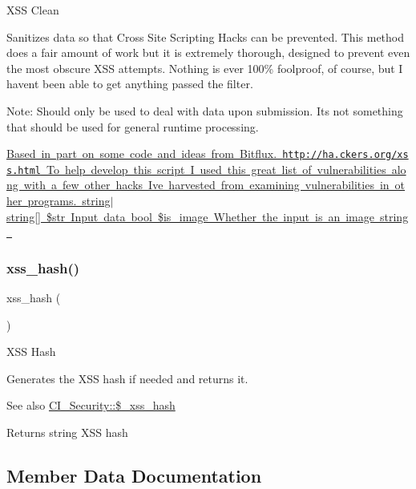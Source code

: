 X\+SS Clean

Sanitizes data so that Cross Site Scripting Hacks can be prevented. This method does a fair amount of work but it is extremely thorough, designed to prevent even the most obscure X\+SS attempts. Nothing is ever 100\% foolproof, of course, but I haven\textquotesingle{}t been able to get anything passed the filter.

Note\+: Should only be used to deal with data upon submission. It\textquotesingle{}s not something that should be used for general runtime processing.

\mbox{\hyperlink{}{Based in part on some code and ideas from Bitflux.  \href{http://ha.ckers.org/xss.html}{\tt http\+://ha.\+ckers.\+org/xss.\+html} To help develop this script I used this great list of vulnerabilities along with a few other hacks I\textquotesingle{}ve harvested from examining vulnerabilities in other programs.  string$\vert$string\mbox{[}\mbox{]} \$str Input data  bool \$is\+\_\+image Whether the input is an image  string }}\mbox{\label{class_c_i___security_ae2f831d3f277e1c03730b28fd1734186}} 
\subsubsection{\texorpdfstring{xss\+\_\+hash()}{xss\_hash()}}
{\footnotesize\ttfamily xss\+\_\+hash (\begin{DoxyParamCaption}{ }\end{DoxyParamCaption})}

X\+SS Hash

Generates the X\+SS hash if needed and returns it.

\begin{DoxySeeAlso}{See also}
\mbox{\hyperlink{class_c_i___security_aca426a0e87199bfa36c7401a1d06a419}{C\+I\+\_\+\+Security\+::\$\+\_\+xss\+\_\+hash}} 
\end{DoxySeeAlso}
\begin{DoxyReturn}{Returns}
string X\+SS hash 
\end{DoxyReturn}


\subsection{Member Data Documentation}
\mbox{\label{class_c_i___security_a52043f2c9ffb0e14eade8e67a0172a82}} 
